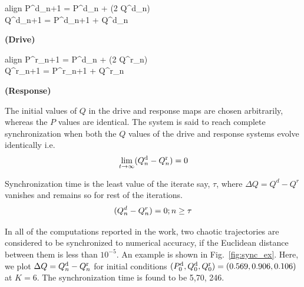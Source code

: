 \documentclass[reprint,amsmath,amssymb,aps,pre]{revtex4-1}
\begin{document}
\begin{minipage}[t]{0.5\textwidth}
	\begin{empheq}[right=\empheqrbrace \mod 1]{align}\nonumber
	\label{equ:drive}
	P^\textnormal{d}_{n+1} = P^\textnormal{d}_n + \sin(2\pi 
	Q^\textnormal{d}_n)\nonumber\\
	Q^\textnormal{d}_{n+1} = P^\textnormal{d}_{n+1} + Q^\textnormal{d}_n 
	\nonumber
	\end{empheq}
	\centering \textbf{(Drive)}
	
\end{minipage}
\begin{minipage}[t]{0.5\textwidth}
	\begin{empheq}[right=\empheqrbrace \mod 1]{align}
	P^\textnormal{r}_{n+1} = P^\textnormal{d}_n + \sin(2\pi 
	Q^\textnormal{r}_n) \nonumber \\
	Q^\textnormal{r}_{n+1} = P^\textnormal{r}_{n+1} + Q^\textnormal{r}_n 
	\nonumber
	\end{empheq}
	\centering \textbf{(Response)}
\end{minipage}

\vspace{.5cm}

The initial values of $Q$ in the drive and response maps are chosen 
arbitrarily, whereas the $P$ values are identical. The system is said to reach 
complete synchronization when both the $Q$ values of the drive and response 
systems evolve identically i.e. 
\begin{equation}
\lim_{t\rightarrow\infty}(Q^\textnormal{d}_n - Q^\textnormal{r}_n) = 0
\end{equation}

Synchronization time is the least value of the iterate say, $\tau$, where $\Delta Q = Q^d-Q^r$ vanishes and remains so for rest of the iterations. 
\begin{equation}
(Q^d_n - Q^r_n) = 0; \hfill  n \geq  \bf {\tau }
\end{equation}

In all of the computations reported in the work, two chaotic trajectories are 
considered to be synchronized to numerical accuracy, if the Euclidean distance 
between them is less than $10^{-5}$. An example is shown in 
Fig.~\ref{fig:sync_ex}. Here, we plot $\Delta Q = 
Q^\textnormal{d}_n-Q^\textnormal{r}_n$ for initial 
conditions $(P^\textnormal{d}_0,Q^\textnormal{d}_0,Q^\textnormal{r}_0) = 
(0.569, 0.906,0.106)$ at $K = 6$. The synchronization time is found to be 5,70,
246. 
\end{document}
